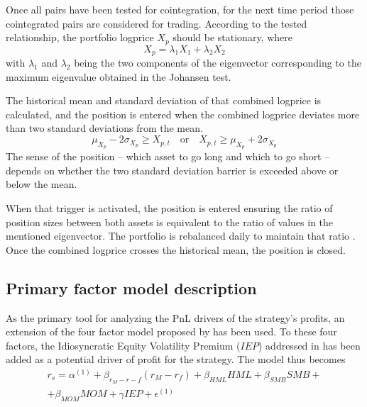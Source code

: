 Once all pairs have been tested for cointegration, for the next time period those cointegrated pairs are considered for trading. According to the tested relationship, the portfolio logprice $X_p$ should be stationary, where
\begin{equation}
    X_p = \lambda_1 X_1 + \lambda_2 X_2
\end{equation}
with $\lambda_1$ and $\lambda_2$ being the two components of the eigenvector corresponding to the maximum eigenvalue obtained in the Johansen test.

The historical mean and standard deviation of that combined logprice is calculated, and the position is entered when the combined logprice deviates more than two standard deviations from the mean. 
\begin{equation}
    \mu_{X_p} - 2\sigma_{X_p} \geq X_{p,t} \quad \text{or} \quad X_{p,t} \geq \mu_{X_p} + 2\sigma_{X_p}
\end{equation}
The sense of the position -- which asset to go long and which to go short -- depends on whether the two standard deviation barrier is exceeded above or below the mean.

When that trigger is activated, the position is entered ensuring the ratio of position sizes between both assets is equivalent to the ratio of values in the mentioned eigenvector. The portfolio is rebalanced daily to maintain that ratio \cite{chan_2013}.
Once the combined logprice crosses the historical mean, the position is closed. 

\subsection{Primary factor model description}
As the primary tool for analyzing the PnL drivers of the strategy's profits, an extension of the four factor model proposed by \cite{carhart_1997} has been used. To these four factors, the Idiosyncratic Equity Volatility Premium ($IEP$) addressed in \cite{ioannis_2024} has been added as a potential driver of profit for the strategy. The model thus becomes
\begin{multline}
    \label{e:primary-regression}
    r_s = \alpha^{(1)} + \beta_{r_M-r-f}(r_M-r_f) + \beta_{HML}HML + \beta_{SMB}SMB + \\ + \beta_{MOM}MOM+ \gamma IEP + \epsilon^{(1)}
\end{multline}

